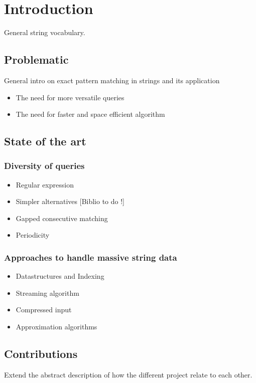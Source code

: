 \chapter*{Introduction}

General string vocabulary.

\section{Problematic}
General intro on exact pattern matching in strings and its application
\begin{itemize}
\item The need for more versatile queries
\item The need for faster and space efficient algorithm
\end{itemize}

\section{State of the art}

\subsection{Diversity of queries}
\begin{itemize}
\item Regular expression
\item Simpler alternatives [Biblio to do !]
\item Gapped consecutive matching
\item Periodicity
\end{itemize}

\subsection{Approaches to handle massive string data}

\begin{itemize}
\item Datastructures and Indexing
\item Streaming algorithm
\item Compressed input
\item Approximation algorithms
\end{itemize}

\section{Contributions}

Extend the abstract description of how the different project relate to each other.




